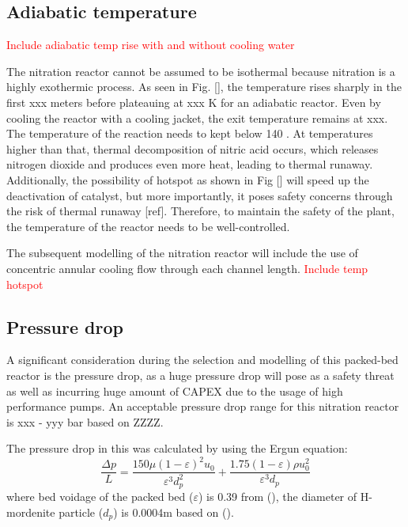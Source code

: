 \subsection{Adiabatic temperature}

\textcolor{red}{Include adiabatic temp rise with and without cooling water }

The nitration reactor cannot be assumed to be isothermal because nitration is a highly exothermic process. As seen in Fig. [], the temperature rises sharply in the first xxx meters before plateauing at xxx K for an adiabatic reactor. Even by cooling the reactor with a cooling jacket, the exit temperature remains at xxx. The temperature of the reaction needs to kept below 140 \degrees \celsius. At temperatures higher than that, thermal decomposition of nitric acid occurs, which releases nitrogen dioxide and produces even more heat, leading to thermal runaway. Additionally, the possibility of hotspot as shown in Fig [] will speed up the deactivation of catalyst, but more importantly, it poses safety concerns through the risk of thermal runaway [ref]. Therefore, to maintain the safety of the plant, the temperature of the reactor needs to be well-controlled.



The subsequent modelling of the nitration reactor will include the use of concentric annular cooling flow through each channel length. 
\textcolor{red}{Include temp hotspot}

\subsection{Pressure drop}

A significant consideration during the selection and modelling of this packed-bed reactor is the pressure drop, as a huge pressure drop will pose as a safety threat as well as incurring huge amount of CAPEX due to the usage of high performance pumps. An acceptable pressure drop range for this nitration reactor is xxx - yyy bar based on ZZZZ. 

The pressure drop in this was calculated by using the Ergun equation: 
\begin{equation}
    \frac{\Delta p}{L} = \frac{150 \mu (1- \varepsilon)^2 u_0}{\varepsilon^3 d_p^2} + \frac{1.75(1-\varepsilon)\rho u_0^2}{\varepsilon^3 d_p}
    \label{eqn:ergun}
\end{equation}
where bed voidage of the packed bed ($\varepsilon$) is 0.39 from (), the diameter of H-mordenite particle ($d_p$) is 0.0004m based on (). 

